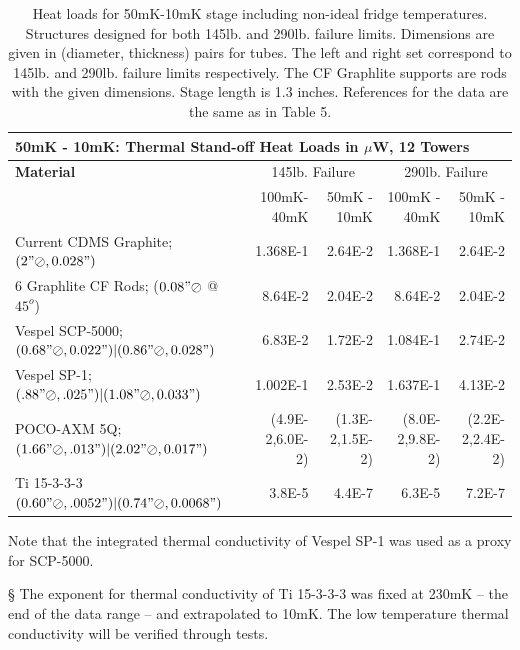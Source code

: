 \documentclass{article}
\begin{document}
\begin{table}[h]
\begin{small}
\begin{threeparttable}
\begin{tabular}{lrrrr}
  \multicolumn{5}{l}{{\Large 50mK - 10mK: Thermal Stand-off Heat Loads in $\mu$W, 12 Towers}} \\
\toprule
\bf{{\large Material}}& \multicolumn{2}{c}{145lb. Failure} & \multicolumn{2}{c}{290lb. Failure} \\
\cmidrule(r){2-5}
& 100mK-40mK & 50mK - 10mK & 100mK - 40mK & 50mK - 10mK \\
Current CDMS Graphite; $(2"\oslash,0.028")$  & 1.368E-1 & 2.64E-2 & 1.368E-1 & 2.64E-2\\
6 Graphlite CF Rods; ($0.08" \oslash$ @ $45^{o}$) & 8.64E-2 & 2.04E-2 & 8.64E-2 & 2.04E-2 \\
Vespel SCP-5000; $(0.68"\oslash,0.022")|(0.86"\oslash,0.028")$ & 6.83E-2\tnote{\dag} & 1.72E-2\tnote{\dag} & 1.084E-1\tnote{\dag} & 2.74E-2\tnote{\dag} \\
Vespel SP-1; $(.88"\oslash,.025")|(1.08"\oslash,0.033")$ & 1.002E-1 & 2.53E-2 & 1.637E-1 & 4.13E-2 \\
POCO-AXM 5Q; $(1.66"\oslash,.013")|(2.02"\oslash,0.017")$ & (4.9E-2,6.0E-2) & (1.3E-2,1.5E-2) & (8.0E-2,9.8E-2) & (2.2E-2,2.4E-2) \\
Ti 15-3-3-3 $(0.60"\oslash,.0052")|(0.74"\oslash,0.0068")$ & 3.8E-5\tnote{\S} & 4.4E-7\tnote{\S} & 6.3E-5\tnote{\S} & 7.2E-7\tnote{\S} \\
\bottomrule
\end{tabular}
\begin{tablenotes}
\item[\dag] Note that the integrated thermal conductivity of Vespel SP-1 was used as a proxy for SCP-5000.
\item[\S] The exponent for thermal conductivity of Ti 15-3-3-3 was fixed at 230mK -- the end of the data range -- and extrapolated to 10mK. The low temperature thermal conductivity will be verified through tests.
\end{tablenotes}
\end{threeparttable}
\caption{Heat loads for 50mK-10mK stage including non-ideal fridge temperatures. Structures designed for both 145lb. and 290lb. failure limits. Dimensions are given in (diameter, thickness) pairs for tubes. The left and right set correspond to 145lb. and 290lb. failure limits respectively. The CF Graphlite supports are rods with the given dimensions. Stage length is 1.3 inches. References for the data are the same as in Table 5.}
\end{small}
\end{table}
\end{document}
